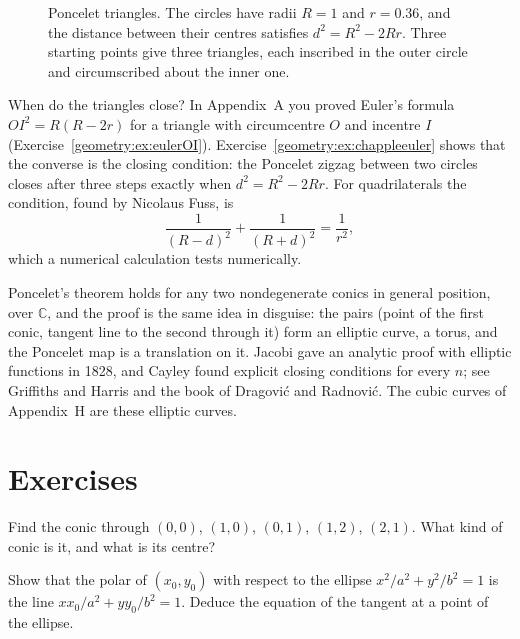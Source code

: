 \begin{figure}[ht]
\centering
{}
\caption{Poncelet triangles. The circles have radii $R=1$ and $r=0.36$, and the distance between their centres satisfies $d^2=R^2-2Rr$. Three
starting points give three triangles, each inscribed in the outer circle and circumscribed about the inner one.}
\label{geometry:fig:poncelet}
\end{figure}

When do the triangles close? In Appendix~A you proved Euler's formula $OI^2=R(R-2r)$ for a triangle with circumcentre $O$ and incentre $I$
(Exercise~\ref{geometry:ex:eulerOI}). Exercise~\ref{geometry:ex:chappleeuler} shows that the converse is the closing condition: the Poncelet zigzag between two
circles closes after three steps exactly when $d^2=R^2-2Rr$. For quadrilaterals the condition, found by Nicolaus Fuss, is
\[
\frac1{(R-d)^2}+\frac1{(R+d)^2}=\frac1{r^2},
\]
which a numerical calculation tests numerically.

\begin{remark}
Poncelet's theorem holds for any two nondegenerate conics in general position, over $\mathbb C$, and the proof is the same idea in disguise: the
pairs (point of the first conic, tangent line to the second through it) form an elliptic curve, a torus, and the Poncelet map is a translation on it.
Jacobi gave an analytic proof with elliptic functions in 1828, and Cayley found explicit closing conditions for every $n$; see Griffiths and Harris and
the book of Dragovi\'c and Radnovi\'c. The cubic curves of Appendix~H are these elliptic curves.
\end{remark}

\section{Exercises}

\begin{exercise}[$\star$]\label{geometry:ex:fivepoints}
Find the conic through $(0,0)$, $(1,0)$, $(0,1)$, $(1,2)$, $(2,1)$. What kind of conic is it, and what is its centre?
\end{exercise}

\begin{exercise}[$\star$]\label{geometry:ex:tangentellipse}
Show that the polar of $(x_0,y_0)$ with respect to the ellipse $x^2/a^2+y^2/b^2=1$ is the line $xx_0/a^2+yy_0/b^2=1$. Deduce the equation of the
tangent at a point of the ellipse.
\end{exercise}

